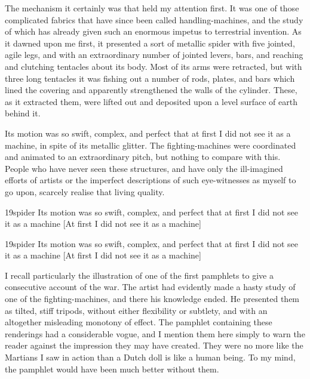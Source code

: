 The mechanism it certainly was that held my attention first. It was one of those complicated fabrics that have since been called handling-machines, and the study of which has already given such an enormous impetus to terrestrial invention. As it dawned upon me first, it presented a sort of metallic spider with five jointed, agile legs, and with an extraordinary number of jointed levers, bars, and reaching and clutching tentacles about its body. Most of its arms were retracted, but with three long tentacles it was fishing out a number of rods, plates, and bars which lined the covering and apparently strengthened the walls of the cylinder. These, as it extracted them, were lifted out and deposited upon a level surface of earth behind it.

Its motion was so swift, complex, and perfect that at first I did not see it as a machine, in spite of its metallic glitter. The fighting-machines were coordinated and animated to an extraordinary pitch, but nothing to compare with this. People who have never seen these structures, and have only the ill-imagined efforts of artists or the imperfect descriptions of such eye-witnesses as myself to go upon, scarcely realise that living quality.


\begin{letter}
	\begin{bwbigpic}
		[1.2] 
		{19spider} 
		{Its motion was so swift, complex, and perfect that at first I did not see it as a machine}
		[At first I did not see it as a machine]
	\end{bwbigpic}
\end{letter}
\begin{a4}
	\begin{bwbigpic}
		[1.1] 
		{19spider} 
		{Its motion was so swift, complex, and perfect that at first I did not see it as a machine}
		[At first I did not see it as a machine]
	\end{bwbigpic}
\end{a4}

I recall particularly the illustration of one of the first pamphlets to give a consecutive account of the war. The artist had evidently made a hasty study of one of the fighting-machines, and there his knowledge ended. He presented them as tilted, stiff tripods, without either flexibility or subtlety, and with an altogether misleading monotony of effect. The pamphlet containing these renderings had a considerable vogue, and I mention them here simply to warn the reader against the impression they may have created. They were no more like the Martians I saw in action than a Dutch doll is like a human being. To my mind, the pamphlet would have been much better without them.

